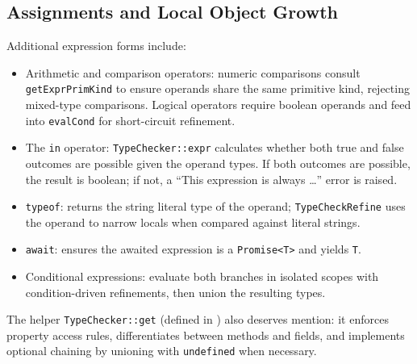\documentclass[11pt]{article}
\newcommand{\code}[1]{\path{#1}}
\begin{document}
\subsection{Assignments and Local Object Growth}
Additional expression forms include:
\begin{itemize}[leftmargin=*]
  \item Arithmetic and comparison operators: numeric comparisons consult \texttt{getExprPrimKind} to ensure operands share the same primitive kind, rejecting mixed-type comparisons. Logical operators require boolean operands and feed into \texttt{evalCond} for short-circuit refinement.
  \item The \texttt{in} operator: \texttt{TypeChecker::expr} calculates whether both true and false outcomes are possible given the operand types. If both outcomes are possible, the result is boolean; if not, a ``This expression is always \ldots'' error is raised.
  \item \texttt{typeof}: returns the string literal type of the operand; \texttt{TypeCheckRefine} uses the operand to narrow locals when compared against literal strings.
  \item \texttt{await}: ensures the awaited expression is a \texttt{Promise<T>} and yields \texttt{T}.
  \item Conditional expressions: evaluate both branches in isolated scopes with condition-driven refinements, then union the resulting types.
\end{itemize}
The helper \texttt{TypeChecker::get} (defined in \code{src/TypeCheckExpr.sk}) also deserves mention: it enforces property access rules, differentiates between methods and fields, and implements optional chaining by unioning with \texttt{undefined} when necessary.
\end{document}
